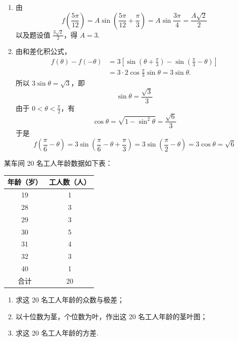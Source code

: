 \begin{solution}
\begin{enumerate}
\item 由
\[
f\left(\frac{5\pi}{12}\right)
=A\sin\left(\frac{5\pi}{12}+\frac{\pi}{3}\right)
=A\sin\frac{3\pi}{4}=\frac{A\sqrt{2}}{2}
\]
以及题设值 \(\frac{3\sqrt{2}}{2}\)，得 \(A=3\).

\item 由和差化积公式，
\[
\begin{aligned}
f(\theta)-f(-\theta)
&=3\left[\sin\left(\theta+\frac{\pi}{3}\right)-\sin\left(\frac{\pi}{3}-\theta\right)\right]\\
&=3\cdot2\cos\frac{\pi}{3}\sin\theta
=3\sin\theta.
\end{aligned}
\]
所以 \(3\sin\theta=\sqrt{3}\)，即
\[
\sin\theta=\frac{\sqrt{3}}{3}
\]
由于 \(0<\theta<\frac{\pi}{2}\)，有
\[
\cos\theta=\sqrt{1-\sin^2\theta}=\frac{\sqrt{6}}{3}
\]
于是
\[
f\left(\frac{\pi}{6}-\theta\right)
=3\sin\left(\frac{\pi}{6}-\theta+\frac{\pi}{3}\right)
=3\sin\left(\frac{\pi}{2}-\theta\right)
=3\cos\theta=\sqrt{6}
\]
\end{enumerate}
\end{solution}

\begin{problem}
某车间 20 名工人年龄数据如下表：

\begin{center}
\begin{tabular}{c|c}
\hline
年龄（岁） & 工人数（人） \\
\hline
19 & 1 \\
28 & 3 \\
29 & 3 \\
30 & 5 \\
31 & 4 \\
32 & 3 \\
40 & 1 \\
\hline
合计 & 20 \\
\hline
\end{tabular}
\end{center}

\begin{enumerate}
\item 求这 20 名工人年龄的众数与极差；
\item 以十位数为茎，个位数为叶，作出这 20 名工人年龄的茎叶图；
\item 求这 20 名工人年龄的方差.
\end{enumerate}
\end{problem}

